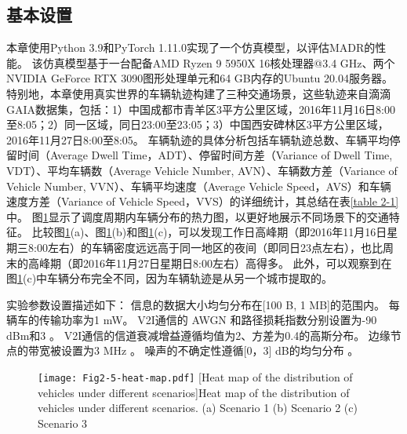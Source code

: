 \subsection{基本设置}
本章使用Python 3.9和PyTorch 1.11.0实现了一个仿真模型，以评估MADR的性能。
该仿真模型基于一台配备AMD Ryzen 9 5950X 16核处理器@3.4 GHz、两个NVIDIA GeForce RTX 3090图形处理单元和64 GB内存的Ubuntu 20.04服务器。
特别地，本章使用真实世界的车辆轨迹构建了三种交通场景，这些轨迹来自滴滴GAIA数据集，包括：1）中国成都市青羊区3平方公里区域，2016年11月16日8:00至8:05；2）同一区域，同日23:00至23:05；3）中国西安碑林区3平方公里区域，2016年11月27日8:00至8:05。
车辆轨迹的具体分析包括车辆轨迹总数、车辆平均停留时间（Average Dwell Time，ADT）、停留时间方差（Variance of Dwell Time, VDT）、平均车辆数（Average Vehicle Number, AVN）、车辆数方差（Variance of Vehicle Number, VVN）、车辆平均速度（Average Vehicle Speed，AVS）和车辆速度方差（Variance of Vehicle Speed，VVS）的详细统计，其总结在表\ref{table 2-1}中。
图\ref{fig 2-5}显示了调度周期内车辆分布的热力图，以更好地展示不同场景下的交通特征。
比较图\ref{fig 2-5}(a)、图\ref{fig 2-5}(b)和图\ref{fig 2-5}(c)，可以发现工作日高峰期（即2016年11月16日星期三8:00左右）的车辆密度远远高于同一地区的夜间（即同日23点左右），也比周末的高峰期（即2016年11月27日星期日8:00左右）高得多。
此外，可以观察到在图\ref{fig 2-5}(c)中车辆分布完全不同，因为车辆轨迹是从另一个城市提取的。

实验参数设置描述如下：
信息的数据大小均匀分布在[100 B, 1 MB]的范围内。
每辆车的传输功率为1 mW。
V2I通信的 AWGN 和路径损耗指数分别设置为-90 dBm和3 \cite{sadek2009distributed}。
V2I通信的信道衰减增益遵循均值为2、方差为0.4的高斯分布。
边缘节点的带宽被设置为3 MHz \cite{wang2019delay}。
噪声的不确定性遵循[0，3] dB的均匀分布 \cite{tandra2008snr}。

\begin{table}[h]\small
\centering
{}
\label{table 2-1}
\end{table}

\begin{figure}[h]
\centering
  \texttt{[image: Fig2-5-heat-map.pdf]}
  [Heat map of the distribution of vehicles under different scenarios]{Heat map of the distribution of vehicles under different scenarios. (a) Scenario 1 (b) Scenario 2 (c) Scenario 3}
  \label{fig 2-5}
\end{figure} 

